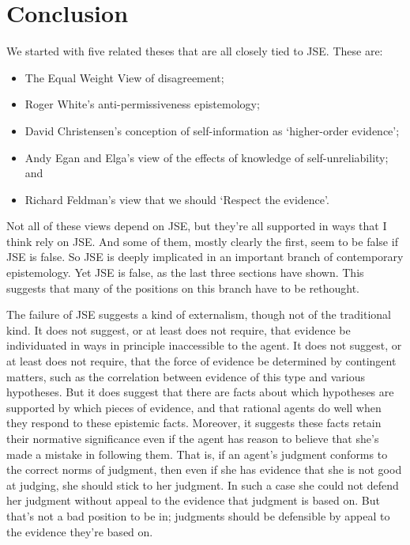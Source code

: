 \section{Conclusion}
We started with five related theses that are all closely tied to JSE. These are:

\begin{itemize}
\item The Equal Weight View of disagreement;
\item Roger White's anti-permissiveness epistemology;
\item David Christensen's conception of self-information as `higher-order evidence';
\item Andy Egan and Elga's view of the effects of knowledge of self-unreliability; and
\item Richard Feldman's view that we should `Respect the evidence'.
\end{itemize}

\noindent Not all of these views depend on JSE, but they're all supported in ways that I think rely on JSE. And some of them, mostly clearly the first, seem to be false if JSE is false. So JSE is deeply implicated in an important branch of contemporary epistemology. Yet JSE is false, as the last three sections have shown. This suggests that many of the positions on this branch have to be rethought.

The failure of JSE suggests a kind of externalism, though not of the traditional kind. It does not suggest, or at least does not require, that evidence be individuated in ways in principle inaccessible to the agent. It does not suggest, or at least does not require, that the force of evidence be determined by contingent matters, such as the correlation between evidence of this type and various hypotheses. But it does suggest that there are facts about which hypotheses are supported by which pieces of evidence, and that rational agents do well when they respond to these epistemic facts. Moreover, it suggests these facts retain their normative significance even if the agent has reason to believe that she's made a mistake in following them. That is, if an agent's judgment conforms to the correct norms of judgment, then even if she has evidence that she is not good at judging, she should stick to her judgment. In such a case she could not defend her judgment without appeal to the evidence that judgment is based on. But that's not a bad position to be in; judgments should be defensible by appeal to the evidence they're based on.
